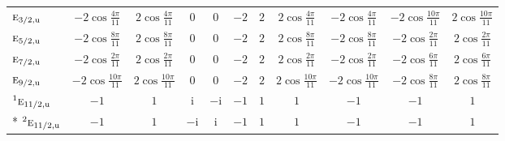 \documentclass[10pt,a4paper]{article}
\numberwithin{equation}{section}
\newcommand{\irr}[1]{\text{\normalfont\scshape #1}}
\newcommand{\conjpair}[1]{{}^{#1}}
\newcommand{\ptag}[1]{\mathrm{#1}}
\newcommand{\iunit}{\mathrm{i}}
\begin{document}
{{\begin{longtable}{@{}lcccccccccc@{}}
$\irr{e}_{3/2,\ptag{u}}$ & $-2\cos\tfrac{4\pi}{11}$ & $2\cos\tfrac{4\pi}{11}$ & $0$ & $0$ & $-2$ & $2$ & $2\cos\tfrac{4\pi}{11}$ & $-2\cos\tfrac{4\pi}{11}$ & $-2\cos\tfrac{10\pi}{11}$ & $2\cos\tfrac{10\pi}{11}$\\
$\irr{e}_{5/2,\ptag{u}}$ & $-2\cos\tfrac{8\pi}{11}$ & $2\cos\tfrac{8\pi}{11}$ & $0$ & $0$ & $-2$ & $2$ & $2\cos\tfrac{8\pi}{11}$ & $-2\cos\tfrac{8\pi}{11}$ & $-2\cos\tfrac{2\pi}{11}$ & $2\cos\tfrac{2\pi}{11}$\\
$\irr{e}_{7/2,\ptag{u}}$ & $-2\cos\tfrac{2\pi}{11}$ & $2\cos\tfrac{2\pi}{11}$ & $0$ & $0$ & $-2$ & $2$ & $2\cos\tfrac{2\pi}{11}$ & $-2\cos\tfrac{2\pi}{11}$ & $-2\cos\tfrac{6\pi}{11}$ & $2\cos\tfrac{6\pi}{11}$\\
$\irr{e}_{9/2,\ptag{u}}$ & $-2\cos\tfrac{10\pi}{11}$ & $2\cos\tfrac{10\pi}{11}$ & $0$ & $0$ & $-2$ & $2$ & $2\cos\tfrac{10\pi}{11}$ & $-2\cos\tfrac{10\pi}{11}$ & $-2\cos\tfrac{8\pi}{11}$ & $2\cos\tfrac{8\pi}{11}$\\
$\conjpair{1}\irr{e}_{11/2,\ptag{u}}$ & $-1$ & $1$ & $\iunit{}$ & $-\iunit{}$ & $-1$ & $1$ & $1$ & $-1$ & $-1$ & $1$\\*
$\conjpair{2}\irr{e}_{11/2,\ptag{u}}$ & $-1$ & $1$ & $-\iunit{}$ & $\iunit{}$ & $-1$ & $1$ & $1$ & $-1$ & $-1$ & $1$\\
\bottomrule\end{longtable}}}
\end{document}
